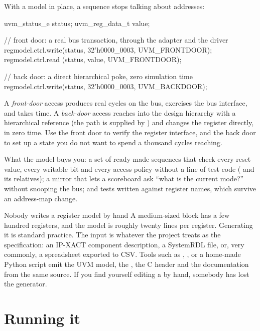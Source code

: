 %
With a model in place, a sequence stops talking about addresses:

\begin{uvmcode}
uvm_status_e status;
uvm_reg_data_t value;

// front door: a real bus transaction, through the adapter and the driver
regmodel.ctrl.write(status, 32'h0000_0003, UVM_FRONTDOOR);
regmodel.ctrl.read (status, value,         UVM_FRONTDOOR);

// back door: a direct hierarchical poke, zero simulation time
regmodel.ctrl.write(status, 32'h0000_0003, UVM_BACKDOOR);
\end{uvmcode}

A \emph{front-door} access produces real cycles on the bus, exercises the bus
interface, and takes time. A \emph{back-door} access reaches into the design
hierarchy with a hierarchical reference (the path is supplied by
) and changes the register directly, in zero time. Use
the front door to verify the register interface, and the back door to set up
a state you do not want to spend a thousand cycles reaching.

What the model buys you: a set of ready-made sequences that check every reset
value, every writable bit and every access policy without a line of test code
( and its relatives); a mirror that lets a
scoreboard ask ``what is the current mode?'' without snooping the bus; and
tests written against register names, which survive an address-map change.

\begin{notebox}{Nobody writes a register model by hand}
A medium-sized block has a few hundred registers, and the model is roughly
twenty lines per register. Generating it is standard practice. The input is
whatever the project treats as the specification: an IP-XACT
 component description, a SystemRDL file, or, very commonly, a
spreadsheet exported to CSV. Tools such as ,
,  or a home-made Python script
emit the UVM model, the \RTL{}, the C header and the documentation from the
same source. If you find yourself editing a  by hand,
somebody has lost the generator.
\end{notebox}

\section{Running it}
\label{sec:uvm:running}

